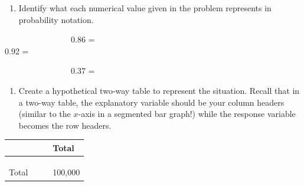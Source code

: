 \documentclass[
]{report}
\providecommand{\tightlist}{%
  \setlength{\itemsep}{0pt}\setlength{\parskip}{0pt}}
\begin{document}
\begin{enumerate}
\def\labelenumi{\alph{enumi}.}
\tightlist
\item
  Identify what each numerical value given in the problem represents in probability notation.
  \vspace{.1in}
\end{enumerate}

~~~~~~~~~~~~~~~~0.86 = \vspace{.1in}\\
\hspace*{0.333em}\hspace*{0.333em}\hspace*{0.333em}\hspace*{0.333em}\hspace*{0.333em}\hspace*{0.333em}\hspace*{0.333em}\hspace*{0.333em}\hspace*{0.333em}\hspace*{0.333em}\hspace*{0.333em}\hspace*{0.333em}\hspace*{0.333em}\hspace*{0.333em}\hspace*{0.333em}\hspace*{0.333em}0.92 =

\vspace{.1in}

~~~~~~~~~~~~~~~~0.37 =

\vspace{.1in}

\begin{enumerate}
\def\labelenumi{\alph{enumi}.}
\setcounter{enumi}{1}
\tightlist
\item
  Create a hypothetical two-way table to represent the situation. Recall that in a two-way table, the explanatory variable should be your column headers (similar to the \(x\)-axis in a segmented bar graph!) while the response variable becomes the row headers.
\end{enumerate}

\begin{longtable}[]{@{}llll@{}}
\toprule
\hspace{1in} & \hspace{1in} & \hspace{1in} & Total\tabularnewline
\midrule
\endhead
\hspace{1in} & & &\tabularnewline
\hspace{1in} & & &\tabularnewline
\hspace{1in} & & &\tabularnewline
Total & & & 100,000\tabularnewline
\bottomrule
\end{longtable}
\end{document}
